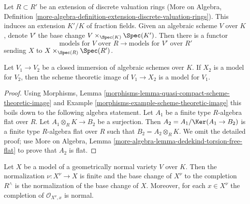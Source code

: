 \medskip\noindent
Let $R \subset R'$ be an extension of discrete valuation rings
(More on Algebra, Definition
\ref{more-algebra-definition-extension-discrete-valuation-rings}).
This induces an extension $K'/K$ of fraction fields.
Given an algebraic scheme $V$ over $K$, denote $V'$ the
base change $V \times_{\Spec(K)} \Spec(K')$. Then there is
a functor
$$
\text{models for }V\text{ over }R
\longrightarrow
\text{models for }V'\text{ over }R'
$$
sending $X$ to $X \times_{\Spec(R)} \Spec(R')$.

\begin{lemma}
\label{lemma-closure-is-model}
Let $V_1 \to V_2$ be a closed immersion of algebraic schemes over $K$.
If $X_2$ is a model for $V_2$, then the scheme theoretic image
of $V_1 \to X_2$ is a model for $V_1$.
\end{lemma}

\begin{proof}
Using
Morphisms, Lemma \ref{morphisms-lemma-quasi-compact-scheme-theoretic-image} and
Example \ref{morphisms-example-scheme-theoretic-image}
this boils down to the following algebra statement.
Let $A_1$ be a finite type $R$-algebra flat over $R$.
Let $A_1 \otimes_R K \to B_2$ be a surjection. Then
$A_2 = A_1 / \Ker(A_1 \to B_2)$ is a finite type $R$-algebra
flat over $R$ such that $B_2 = A_2 \otimes_R K$.
We omit the detailed proof; use
More on Algebra, Lemma \ref{more-algebra-lemma-dedekind-torsion-free-flat}
to prove that $A_2$ is flat.
\end{proof}

\begin{lemma}
\label{lemma-normalization}
Let $X$ be a model of a geometrically normal variety $V$ over $K$.
Then the normalization $\nu : X^\nu \to X$ is finite and
the base change of $X^\nu$ to the completion $R^\wedge$
is the normalization of the base change of $X$. Moreover, for
each $x \in X^\nu$ the completion of $\mathcal{O}_{X^\nu, x}$
is normal.
\end{lemma}

